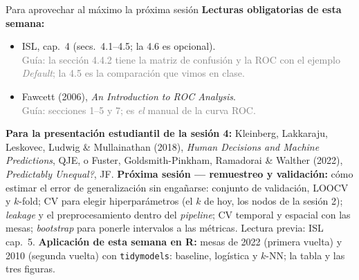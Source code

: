 \documentclass{beamer}
\newcommand{\1}{\mathbb{I}}
\begin{document}
\begin{frame}{Para aprovechar al máximo la próxima sesión}
\small
\textbf{Lecturas obligatorias de esta semana:}
\begin{itemize}\itemsep4pt
  \item ISL, cap.\ 4 (secs.\ 4.1--4.5; la 4.6 es opcional). \\ \textcolor{gray}{Guía: la sección 4.4.2 tiene la matriz de confusión y la ROC con el ejemplo \emph{Default}; la 4.5 es la comparación que vimos en clase.}
  \item Fawcett (2006), \emph{An Introduction to ROC Analysis}. \\ \textcolor{gray}{Guía: secciones 1--5 y 7; es \emph{el} manual de la curva ROC.}
\end{itemize}
\textbf{Para la presentación estudiantil de la sesión 4:} Kleinberg, Lakkaraju, Leskovec, Ludwig \& Mullainathan (2018), \emph{Human Decisions and Machine Predictions}, QJE, o Fuster, Goldsmith-Pinkham, Ramadorai \& Walther (2022), \emph{Predictably Unequal?}, JF.
\pause
\vspace{0.15cm}
\textbf{Próxima sesión --- remuestreo y validación:} cómo estimar el error de generalización sin engañarse: conjunto de validación, LOOCV y $k$-fold; CV para elegir hiperparámetros (el $k$ de hoy, los nodos de la sesión 2); \emph{leakage} y el preprocesamiento dentro del \emph{pipeline}; CV temporal y espacial con las mesas; \emph{bootstrap} para ponerle intervalos a las métricas. Lectura previa: ISL cap.\ 5.
\pause
\vspace{0.15cm}
\textbf{Aplicación de esta semana en R:} mesas de 2022 (primera vuelta) y 2010 (segunda vuelta) con \texttt{tidymodels}: baseline, logística y $k$-NN; la tabla y las tres figuras.
\end{frame}
\end{document}
